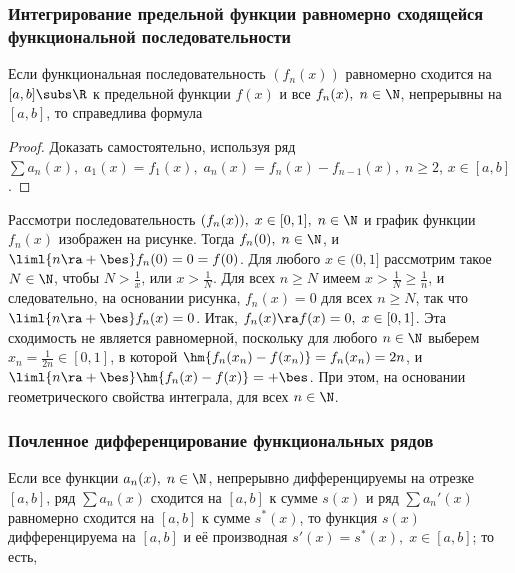 \documentclass[a4paper]{article}
\begin{document}
\subsubsection{Интегрирование предельной функции равномерно
сходящейся функциональной последовательности}
\begin{theorem}
Если функциональная последовательность $(f_n(x))$ равномерно
сходится на $[a,b]\subs\R$ к предельной функции $f(x)$ и все
$f_n(x), \; n\in\N$, непрерывны на $[a,b]$, то справедлива формула
\end{theorem}

\begin{proof}
Доказать самостоятельно, используя ряд $\sum a_n(x), \; a_1(x) =
f_1(x), \; a_n(x) = f_n(x) - f_{n-1}(x), \; n\ge 2$, $x\in[a,b]$.
\end{proof}

\begin{ex}
Рассмотри последовательность $(f_n(x)), \; x\in[0,1], \; n\in\N$ и
график функции $f_n(x)$ изображен на рисунке.
Тогда $f_n(0), \; n\in\N$, и $\liml{n\ra+\bes}f_n(0)=0=f(0)$. Для
любого $x\in(0,1]$ рассмотрим такое $N\in\N$, чтобы $N>\frac1x$, или
$x>\frac1N$. Для всех $n\ge N$ имеем $x>\frac1N \ge \frac1n$, и
следовательно, на основании рисунка, $f_n(x)=0$ для всех $n\ge N$,
так что $\liml{n\ra+\bes}f_n(x)=0$. Итак, $f_n(x)\ra f(x)=0, \;
x\in[0,1]$. Эта сходимость не является равномерной, поскольку для
любого $n\in\N$ выберем $x_n=\frac1{2n}\in[0,1]$, в которой
$\hm{f_n(x_n) - f(x_n)} = f_n(x_n)=2n$, и $\liml{n\ra+\bes}
\hm{f_n(x)-f(x)}=+\bes$. При этом, на основании геометрического
свойства интеграла,
для всех $n\in\N$.
\end{ex}

\subsubsection{Почленное дифференцирование функциональных рядов}

\begin{theorem}
Если все функции $a_n(x), \; n\in\N$, непрерывно дифференцируемы на
отрезке $[a,b]$, ряд $\sum a_n(x)$ сходится на $[a,b]$ к сумме
$s(x)$ и ряд $\sum a_n'(x)$ равномерно сходится на $[a,b]$ к сумме
$s^*(x)$, то функция $s(x)$ дифференцируема на $[a,b]$ и её
производная $s'(x) = s^*(x), \; x\in[a,b]$; то есть,
\end{theorem}
\end{document}
